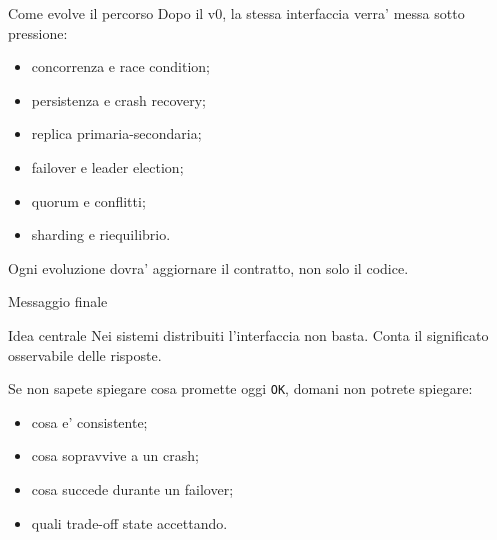 \documentclass[aspectratio=169]{beamer}
\begin{document}
\begin{frame}{Come evolve il percorso}
  Dopo il v0, la stessa interfaccia verra' messa sotto pressione:

  \begin{itemize}
    \item concorrenza e race condition;
    \item persistenza e crash recovery;
    \item replica primaria-secondaria;
    \item failover e leader election;
    \item quorum e conflitti;
    \item sharding e riequilibrio.
  \end{itemize}

  Ogni evoluzione dovra' aggiornare il contratto, non solo il codice.
\end{frame}

\begin{frame}{Messaggio finale}
  \begin{block}{Idea centrale}
    Nei sistemi distribuiti l'interfaccia non basta. Conta il significato osservabile delle risposte.
  \end{block}

  Se non sapete spiegare cosa promette oggi \texttt{OK}, domani non potrete spiegare:

  \begin{itemize}
    \item cosa e' consistente;
    \item cosa sopravvive a un crash;
    \item cosa succede durante un failover;
    \item quali trade-off state accettando.
  \end{itemize}
\end{frame}
\end{document}
